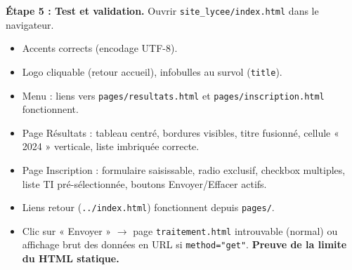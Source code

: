 \documentclass[11pt]{article}
\begin{document}
\begin{exoresolu}
\textbf{Étape 5 : Test et validation.}
Ouvrir \texttt{site\_lycee/index.html} dans le navigateur.
\begin{itemize}
\item[✓] Accents corrects (encodage UTF-8).
\item[✓] Logo cliquable (retour accueil), infobulles au survol (\texttt{title}).
\item[✓] Menu : liens vers \texttt{pages/resultats.html} et \texttt{pages/inscription.html} fonctionnent.
\item[✓] Page Résultats : tableau centré, bordures visibles, titre fusionné, cellule « 2024 » verticale, liste imbriquée correcte.
\item[✓] Page Inscription : formulaire saisissable, radio exclusif, checkbox multiples, liste TI pré-sélectionnée, boutons Envoyer/Effacer actifs.
\item[✓] Liens retour (\texttt{../index.html}) fonctionnent depuis \texttt{pages/}.
\item[✗] Clic sur « Envoyer » $\rightarrow$ page \texttt{traitement.html} introuvable (normal) ou affichage brut des données en URL si \texttt{method="get"}. \textbf{Preuve de la limite du HTML statique.}
\end{itemize}
\end{exoresolu}
\end{document}
